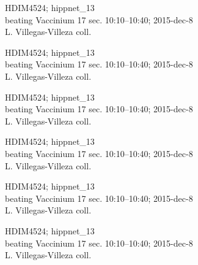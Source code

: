 \documentclass[2pt]{extarticle}
\begin{document}
\noindent
\parbox{0.16\textwidth}{\tiny \raggedright \rule[-0.3\baselineskip]{0pt}{10pt}HDIM4524; hippnet\_13\\ beating Vaccinium 17 sec. 10:10--10:40; 2015-dec-8\\ L. Villegas-Villeza coll.}
\parbox{0.16\textwidth}{\tiny \raggedright \rule[-0.3\baselineskip]{0pt}{10pt}HDIM4524; hippnet\_13\\ beating Vaccinium 17 sec. 10:10--10:40; 2015-dec-8\\ L. Villegas-Villeza coll.}
\parbox{0.16\textwidth}{\tiny \raggedright \rule[-0.3\baselineskip]{0pt}{10pt}HDIM4524; hippnet\_13\\ beating Vaccinium 17 sec. 10:10--10:40; 2015-dec-8\\ L. Villegas-Villeza coll.}
\parbox{0.16\textwidth}{\tiny \raggedright \rule[-0.3\baselineskip]{0pt}{10pt}HDIM4524; hippnet\_13\\ beating Vaccinium 17 sec. 10:10--10:40; 2015-dec-8\\ L. Villegas-Villeza coll.}
\parbox{0.16\textwidth}{\tiny \raggedright \rule[-0.3\baselineskip]{0pt}{10pt}HDIM4524; hippnet\_13\\ beating Vaccinium 17 sec. 10:10--10:40; 2015-dec-8\\ L. Villegas-Villeza coll.}
\parbox{0.16\textwidth}{\tiny \raggedright \rule[-0.3\baselineskip]{0pt}{10pt}HDIM4524; hippnet\_13\\ beating Vaccinium 17 sec. 10:10--10:40; 2015-dec-8\\ L. Villegas-Villeza coll.} \\ 
\vspace{0.001in} 
\end{document}
